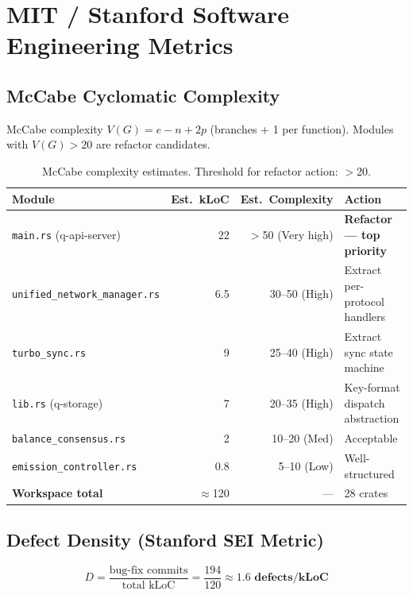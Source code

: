 \documentclass[12pt,a4paper]{article}
\begin{document}
\section{MIT / Stanford Software Engineering Metrics}

\subsection{McCabe Cyclomatic Complexity}

McCabe complexity $V(G) = e - n + 2p$ (branches + 1 per function).
Modules with $V(G) > 20$ are refactor candidates.

\begin{table}[H]
\centering
\small
\begin{tabularx}{\linewidth}{lrrX}
\toprule
\textbf{Module} & \textbf{Est.\ kLoC} & \textbf{Est.\ Complexity} & \textbf{Action} \\
\midrule
\texttt{main.rs} (q-api-server) & 22 & $>$50 \textcolor{qred}{(Very high)} & \textbf{Refactor — top priority} \\
\rowcolor{rowgray}
\texttt{unified\_network\_manager.rs} & 6.5 & 30--50 \textcolor{qred}{(High)} & Extract per-protocol handlers \\
\texttt{turbo\_sync.rs} & 9 & 25--40 \textcolor{qorange}{(High)} & Extract sync state machine \\
\rowcolor{rowgray}
\texttt{lib.rs} (q-storage) & 7 & 20--35 \textcolor{qorange}{(High)} & Key-format dispatch abstraction \\
\texttt{balance\_consensus.rs} & 2 & 10--20 \textcolor{qgreen}{(Med)} & Acceptable \\
\rowcolor{rowgray}
\texttt{emission\_controller.rs} & 0.8 & 5--10 \textcolor{qgreen}{(Low)} & Well-structured \\
\midrule
\textbf{Workspace total} & $\approx$120 & --- & 28 crates \\
\bottomrule
\end{tabularx}
\caption{McCabe complexity estimates. Threshold for refactor action: $>$20.}
\end{table}

\subsection{Defect Density (Stanford SEI Metric)}

\[
  D = \frac{\text{bug-fix commits}}{\text{total kLoC}} = \frac{194}{120}
  \approx \mathbf{1.6 \text{ defects/kLoC}}
\]
\end{document}
